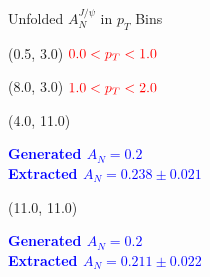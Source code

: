 \documentclass[10pt, xcolor={dvipsnames}, aspectratio = 169]{beamer}
\begin{document}
\begin{frame}{Unfolded $A^{J/\psi}_{N}$ in $p_{T}$ Bins}
\begin{textblock}{3.0}(0.5, 3.0)
$\color{red} 0.0 < p_{T} < 1.0$
\end{textblock}

\begin{textblock}{3.0}(8.0, 3.0)
$\color{red} 1.0 < p_{T} < 2.0$
\end{textblock}

\begin{textblock}{5.0}(4.0, 11.0)
\begin{small}
\textcolor{blue}{\textbf{Generated $A_{N} = 0.2$ \\
Extracted $A_{N} = 0.238 \pm 0.021$}}
\end{small}
\end{textblock}

\begin{textblock}{5.0}(11.0, 11.0)
\begin{small}
\textcolor{blue}{\textbf{Generated $A_{N} = 0.2$ \\
Extracted $A_{N} = 0.211 \pm 0.022$}}
\end{small}
\end{textblock}

\end{frame}
\end{document}
